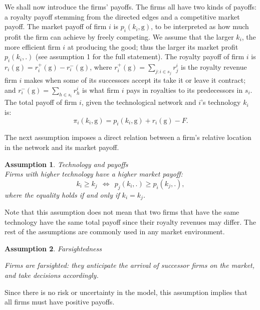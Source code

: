 \documentclass{article}
\newtheorem{assumption}{Assumption}
\begin{document}
We shall now introduce the firms' payoffs. The firms all have two kinds of payoffs: a royalty payoff stemming from the directed edges and a competitive market payoff. The market payoff of firm $i$ is $p_i(k_i,\text{g})$, to be interpreted as how much profit the firm can achieve by freely competing. We assume that the larger $k_i$, the more efficient firm $i$ at producing the good; thus the larger its market profit $p_i(k_i,.)$ (see assumption 1 for the full statement). The royalty payoff of firm $i$ is $r_i(\text{g})=r_i^+(\text{g})-r_i^-(\text{g})$, where $r^+_i(\text{g})=\sum_{j: i\in s_j}r^{i}_j$ is the royalty revenue firm $i$ makes when some of its successors accept its take it or leave it contract; and $r^-_i(\text{g})=\sum_{h\in s_i}r^{i}_h$ is what firm $i$ pays in royalties to its predecessors in $s_i$. The total payoff of firm $i$, given the technological network  and $i$'s technology $k_i$ is: 
\begin{equation}
    \pi_i(k_i,\text{g})=p_i(k_i,\text{g})+r_i(\text{g}) -F. 
\end{equation}

\indent The next assumption imposes a direct relation between a firm's relative location in the network and its market payoff.\\  

\begin{assumption}{Technology and payoffs} \label{ass1}\\
Firms with higher technology have a higher market payoff:
\begin{equation*}
     k_i\geq k_j~~ \Leftrightarrow ~~ p_j(k_i,.)\geq  p_i(k_j,.),
\end{equation*}
where the equality holds if and only if $k_i=k_j$.
\end{assumption}

Note that this assumption does not mean that two firms that have the same technology have the same total payoff since their royalty revenues may differ. The rest of the assumptions are commonly used in any market environment. \\

\begin{assumption}{Farsightedness} \label{ass2}

Firms are farsighted: they anticipate the arrival of successor firms on the market, and take decisions accordingly. 
\end{assumption}

Since there is no risk or uncertainty in the model, this assumption implies that all firms must have positive payoffs. 
\end{document}

